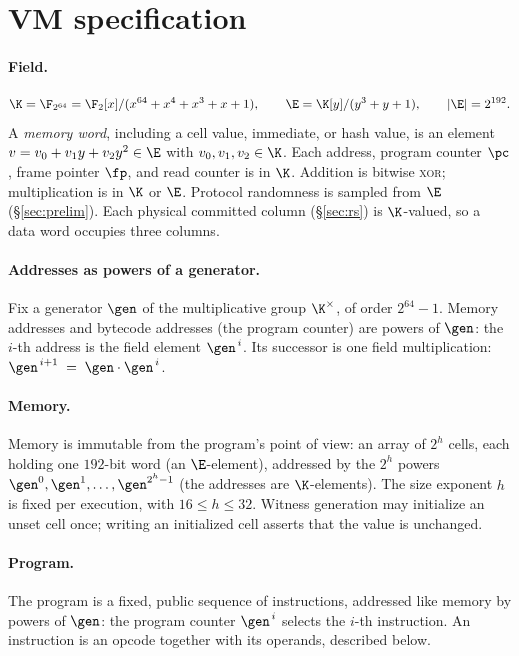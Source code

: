 \section{VM specification}\label{sec:vm}

\paragraph{Field.}
\[
  \K=\F_{2^{64}}=\F_2[x]/(x^{64}+x^4+x^3+x+1),
  \qquad
  \E=\K[y]/(y^3+y+1),
  \qquad |\E|=2^{192}.
\]
A \emph{memory word}, including a cell value, immediate, or hash value, is an element $v=v_0+v_1y+v_2y^2\in\E$ with $v_0,v_1,v_2\in\K$. Each address, program counter $\pc$, frame pointer $\fp$, and read counter is in $\K$. Addition is bitwise \textsc{xor}; multiplication is in $\K$ or $\E$. Protocol randomness is sampled from $\E$ (\S\ref{sec:prelim}). Each physical committed column (\S\ref{sec:rs}) is $\K$-valued, so a data word occupies three columns.

\paragraph{Addresses as powers of a generator.} Fix a generator $\gen$ of the multiplicative group $\K^{\times}$, of order $2^{64}-1$. Memory addresses and bytecode addresses (the program counter) are powers of $\gen$: the $i$-th address is the field element $\gen^{\,i}$. Its successor is one field multiplication: $\gen^{\,i+1}\;=\;\gen\cdot\gen^{\,i}$.

\paragraph{Memory.} Memory is immutable from the program's point of view: an array of $2^{h}$ cells, each holding one $192$-bit word (an $\E$-element), addressed by the $2^{h}$ powers $\gen^{0},\gen^{1},\dots,\gen^{2^{h}-1}$ (the addresses are $\K$-elements). The size exponent $h$ is fixed per execution, with $16\le h\le 32$. Witness generation may initialize an unset cell once; writing an initialized cell asserts that the value is unchanged.

\paragraph{Program.} The program is a fixed, public sequence of instructions, addressed like memory by powers of $\gen$: the program counter $\gen^{\,i}$ selects the $i$-th instruction. An instruction is an opcode together with its operands, described below.

